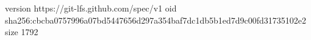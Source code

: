 version https://git-lfs.github.com/spec/v1
oid sha256:cbcba0757996a07bd5447656d297a354baf7dc1db5b1ed7d9c00fd31735102e2
size 1792
